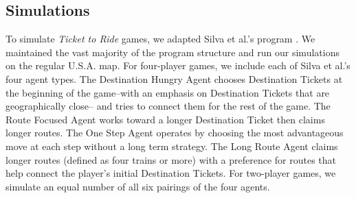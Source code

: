 \subsection{Simulations}
To simulate \textit{Ticket to Ride} games, we adapted Silva et al.'s program
\cite{silva2019, witter2019}.
We maintained the vast majority of the program structure and run our simulations
on the regular U.S.A. map.
For four-player games, we include each of Silva et al.'s four agent types.
The Destination Hungry Agent chooses Destination Tickets at the beginning of the
game--with an emphasis on Destination Tickets that are geographically close--
and tries to connect them for the rest of the game.
The Route Focused Agent works toward a longer Destination Ticket then
claims longer routes.
The One Step Agent operates by choosing the most advantageous move at each
step without a long term strategy.
The Long Route Agent claims longer routes (defined as four trains or more)
with a preference for routes that help connect the player's initial Destination Tickets.
For two-player games, we simulate an equal number of all six pairings of the four
agents. 
